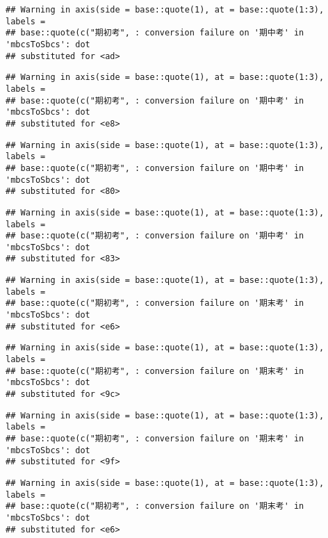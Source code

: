 \documentclass[
]{book}
\begin{document}
\begin{verbatim}
## Warning in axis(side = base::quote(1), at = base::quote(1:3), labels =
## base::quote(c("期初考", : conversion failure on '期中考' in 'mbcsToSbcs': dot
## substituted for <ad>
\end{verbatim}

\begin{verbatim}
## Warning in axis(side = base::quote(1), at = base::quote(1:3), labels =
## base::quote(c("期初考", : conversion failure on '期中考' in 'mbcsToSbcs': dot
## substituted for <e8>
\end{verbatim}

\begin{verbatim}
## Warning in axis(side = base::quote(1), at = base::quote(1:3), labels =
## base::quote(c("期初考", : conversion failure on '期中考' in 'mbcsToSbcs': dot
## substituted for <80>
\end{verbatim}

\begin{verbatim}
## Warning in axis(side = base::quote(1), at = base::quote(1:3), labels =
## base::quote(c("期初考", : conversion failure on '期中考' in 'mbcsToSbcs': dot
## substituted for <83>
\end{verbatim}

\begin{verbatim}
## Warning in axis(side = base::quote(1), at = base::quote(1:3), labels =
## base::quote(c("期初考", : conversion failure on '期末考' in 'mbcsToSbcs': dot
## substituted for <e6>
\end{verbatim}

\begin{verbatim}
## Warning in axis(side = base::quote(1), at = base::quote(1:3), labels =
## base::quote(c("期初考", : conversion failure on '期末考' in 'mbcsToSbcs': dot
## substituted for <9c>
\end{verbatim}

\begin{verbatim}
## Warning in axis(side = base::quote(1), at = base::quote(1:3), labels =
## base::quote(c("期初考", : conversion failure on '期末考' in 'mbcsToSbcs': dot
## substituted for <9f>
\end{verbatim}

\begin{verbatim}
## Warning in axis(side = base::quote(1), at = base::quote(1:3), labels =
## base::quote(c("期初考", : conversion failure on '期末考' in 'mbcsToSbcs': dot
## substituted for <e6>
\end{verbatim}
\end{document}

